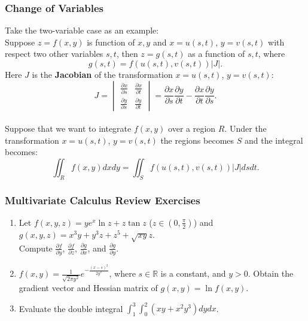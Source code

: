 \documentclass{beamer}
\begin{document}
\begin{frame} 
\frametitle{Change of Variables}
Take the two-variable case as an example:\\
Suppose $z=f(x,y)$ is function of $x,y$ and $x = u(s,t)$, $y = v(s,t)$ with respect two other variables $s,t$, then $z=g(s,t)$ as a function of $s,t$, where
$$
g(s,t) = f(u(s,t),v(s,t))\vert J\vert.
$$
Here $J$ is the \textbf{Jacobian} of the transformation $x = u(s,t)$, $y = v(s,t)$:
$$
J =
\begin{vmatrix}
\frac{\partial x}{\partial s} & \frac{\partial x}{\partial t} \\
\frac{\partial y}{\partial s} & \frac{\partial y}{\partial t}
\end{vmatrix}
= \frac{\partial x}{\partial s}\frac{\partial y}{\partial t} - \frac{\partial x}{\partial t}\frac{\partial y}{\partial s}.
$$
~\\
Suppose that we want to integrate $f(x,y)$ over a region $R$. Under the transformation $x = u(s,t)$, $y = v(s,t)$ the regions becomes $S$ and the integral becomes:
$$
\iint_R f(x,y) dxdy = \iint_S f(u(s,t),v(s,t))\vert J\vert dsdt.
$$
\end{frame}


\begin{frame}
\frametitle{Multivariate Calculus Review Exercises}
\begin{enumerate}
\item Let $f(x,y,z)=ye^x \ln z + z \tan z$ ($z \in (0,\frac{\pi}{2})$) and $g(x,y,z)=x^3y+y^3z+z^5+\sqrt{xy}z$.\\ Compute $\frac{\partial f}{\partial y}$, $\frac{\partial f}{\partial z}$, $\frac{\partial g}{\partial x}$, and $\frac{\partial g}{\partial y}$.
\vspace*{0.3in}
\item $f(x,y) = \frac{1}{\sqrt{2\pi y^2}}e^{-\frac{(x-s)^2}{2y^2}}$, where $s \in \mathbb{R}$ is a constant, and $y>0$. Obtain the gradient vector and Hessian matrix of $g(x,y)=\ln f(x,y)$.
\vspace*{0.3in}
\item Evaluate the double integral $\int_1^3 \int_0^2 (xy + x^2y^3)dydx$.
\end{enumerate}




\end{frame}
\end{document}
